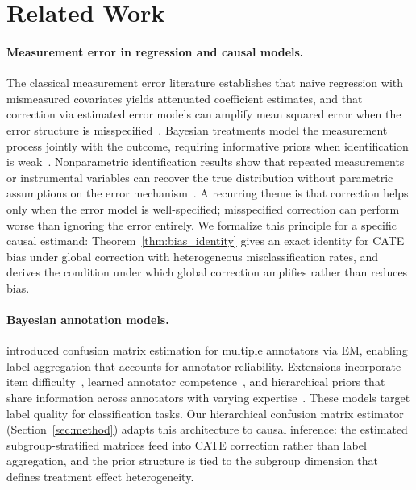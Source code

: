 \section{Related Work}
\label{sec:related}

\paragraph{Measurement error in regression and causal models.}
The classical measurement error literature establishes that naive regression with mismeasured covariates yields attenuated coefficient estimates, and that correction via estimated error models can amplify mean squared error when the error structure is misspecified~\cite{fuller1987measurement,carroll2006measurement}.
Bayesian treatments model the measurement process jointly with the outcome, requiring informative priors when identification is weak~\cite{gustafson2003measurement}.
Nonparametric identification results show that repeated measurements or instrumental variables can recover the true distribution without parametric assumptions on the error mechanism~\cite{hu2008nonparametric}.
A recurring theme is that correction helps only when the error model is well-specified; misspecified correction can perform worse than ignoring the error entirely.
We formalize this principle for a specific causal estimand: Theorem~\ref{thm:bias_identity} gives an exact identity for CATE bias under global correction with heterogeneous misclassification rates, and derives the condition under which global correction amplifies rather than reduces bias.

\paragraph{Bayesian annotation models.}
\citet{dawid1979maximum} introduced confusion matrix estimation for multiple annotators via EM, enabling label aggregation that accounts for annotator reliability.
Extensions incorporate item difficulty~\cite{passonneau2014benefits}, learned annotator competence~\cite{hovy2013learning}, and hierarchical priors that share information across annotators with varying expertise~\cite{paun2018comparing}.
These models target label quality for classification tasks.
Our hierarchical confusion matrix estimator (Section~\ref{sec:method}) adapts this architecture to causal inference: the estimated subgroup-stratified matrices feed into CATE correction rather than label aggregation, and the prior structure is tied to the subgroup dimension that defines treatment effect heterogeneity.

